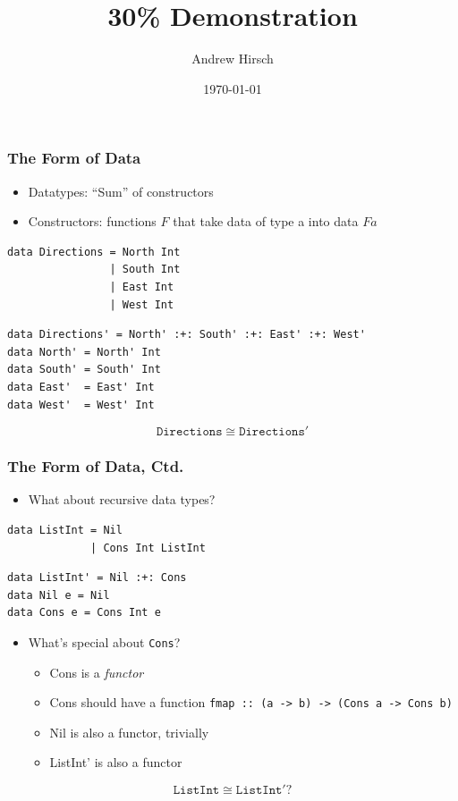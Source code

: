 \documentclass[bigger]{beamer}
\institute[GWU]{The George Washington University}
\title{30\% Demonstration}
\author{Andrew Hirsch}
\date{\today}
\begin{document}
\maketitle


\begin{frame}[fragile]
\frametitle{The Form of Data}
\label{sec-1}


\begin{itemize}
\item Datatypes: ``Sum'' of constructors
\item Constructors: functions $F$ that take data of type a into data $F a$
\end{itemize}

\begin{lstlisting}
data Directions = North Int
                | South Int
                | East Int
                | West Int
\end{lstlisting}

\begin{lstlisting}
data Directions' = North' :+: South' :+: East' :+: West'
data North' = North' Int
data South' = South' Int
data East'  = East' Int
data West'  = West' Int
\end{lstlisting}

$$\mathtt{Directions} \cong \mathtt{Directions'}$$
\end{frame}
\begin{frame}[fragile]
\frametitle{The Form of Data, Ctd.}
\label{sec-2}


\begin{itemize}
\item What about recursive data types?
\end{itemize}

\begin{lstlisting}
data ListInt = Nil
             | Cons Int ListInt
\end{lstlisting}

\begin{lstlisting}
data ListInt' = Nil :+: Cons
data Nil e = Nil
data Cons e = Cons Int e
\end{lstlisting}

\begin{itemize}
\item What's special about \verb~Cons~?
\begin{itemize}
\item Cons is a \emph{functor}
\item Cons should have a function \lstinline{fmap :: (a -> b) -> (Cons a -> Cons b)}
\item Nil is also a functor, trivially
\item ListInt' is also a functor
\end{itemize}
\end{itemize}

$$\mathtt{ListInt} \cong \mathtt{ListInt'}?$$
\end{frame}
\end{document}
